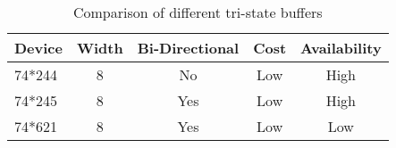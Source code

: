 \begin{table}[bhp]
\caption[Buffer Comparison]{Comparison of different tri-state buffers}
\small
\begin{center}
\begin{tabular}{l| c c c c}
\setlength{\tabcolsep}{1pt}
	Device & Width & Bi-Directional & Cost & Availability \\\hline
	74*244 & 8     & No             & Low  & High\\
	74*245 & 8     & Yes            & Low  & High\\
	74*621 & 8     & Yes            & Low  & Low
\end{tabular}
\end{center}
\label{tab:buffer comparison}
\end{table}


